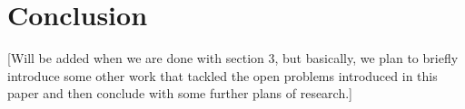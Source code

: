 \documentclass[11pt]{article}
\begin{document}
 
\section{Conclusion}

[Will be added when we are done with section 3, but basically, we plan to briefly introduce some other work that tackled the open problems introduced in this paper and then conclude with some further plans of research.]



\end{document}
